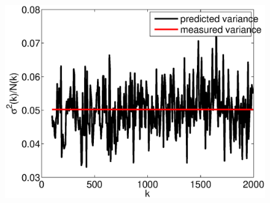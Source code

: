 \documentclass{report}
\begin{document}
\begin{figure}
  \begin{center}
    \includegraphics[width=\textwidth]{figs/results/perc_100_to_2000_variance.eps}
  \end{center}
\end{figure}
\end{document}
